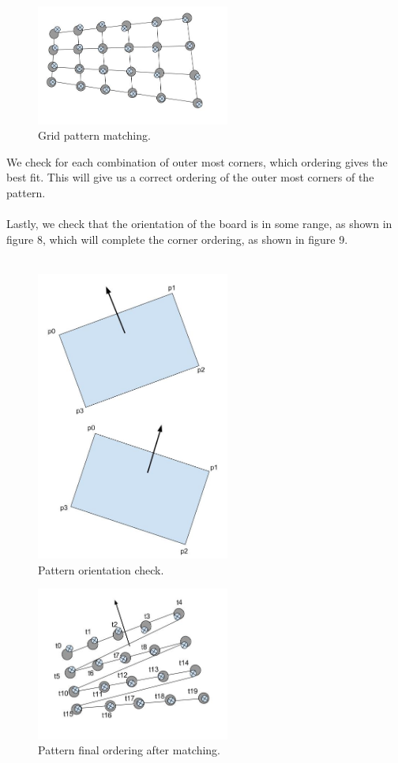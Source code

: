 \documentclass[journal]{IEEEtran}
\begin{document}
\begin{figure}[H]
\centering
\includegraphics[width=2.5in]{_img/img_report3_pattern_matching.jpg}
\caption{Grid pattern matching.}
\end{figure}

We check for each combination of outer most corners, which ordering gives the best fit. This will give us a correct ordering of the outer most corners of the pattern.
\\
\\
Lastly, we check that the orientation of the board is in some range, as shown in figure 8, which will complete the corner ordering, as shown in figure 9.
\\
\\
\begin{figure}[H]
\centering
\includegraphics[width=2.5in]{_img/img_pattern_orientation_checking.jpg}
\caption{Pattern orientation check.}
\end{figure}

\begin{figure}[H]
\centering
\includegraphics[width=2.5in]{_img/img_report3_pattern_order_check.jpg}
\caption{Pattern final ordering after matching.}
\end{figure}
\end{document}
